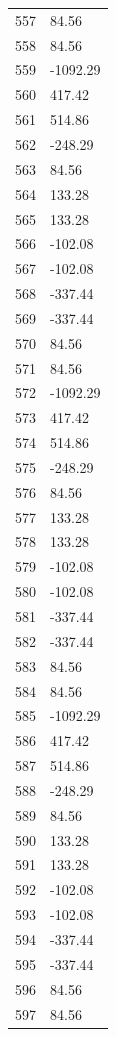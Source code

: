 \documentclass[a4paper,11pt]{article}
\begin{document}
\begin{center}
\begin{longtable}{|R{1.5cm}|R{2.5cm}|}
  557 &        84.56 \\
  558 &        84.56 \\
  559 &     -1092.29 \\
  560 &       417.42 \\
  561 &       514.86 \\
  562 &      -248.29 \\
  563 &        84.56 \\
  564 &       133.28 \\
  565 &       133.28 \\
  566 &      -102.08 \\
  567 &      -102.08 \\
  568 &      -337.44 \\
  569 &      -337.44 \\
  570 &        84.56 \\
  571 &        84.56 \\
  572 &     -1092.29 \\
  573 &       417.42 \\
  574 &       514.86 \\
  575 &      -248.29 \\
  576 &        84.56 \\
  577 &       133.28 \\
  578 &       133.28 \\
  579 &      -102.08 \\
  580 &      -102.08 \\
  581 &      -337.44 \\
  582 &      -337.44 \\
  583 &        84.56 \\
  584 &        84.56 \\
  585 &     -1092.29 \\
  586 &       417.42 \\
  587 &       514.86 \\
  588 &      -248.29 \\
  589 &        84.56 \\
  590 &       133.28 \\
  591 &       133.28 \\
  592 &      -102.08 \\
  593 &      -102.08 \\
  594 &      -337.44 \\
  595 &      -337.44 \\
  596 &        84.56 \\
  597 &        84.56 \\

\end{longtable}
\end{center}
\end{document}
